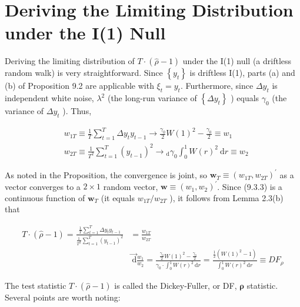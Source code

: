 \documentclass[10pt]{article}
\begin{document}
\section*{Deriving the Limiting Distribution under the I(1) Null}
Deriving the limiting distribution of $T \cdot(\hat{\rho}-1)$ under the I(1) null (a driftless random walk) is very straightforward. Since $\left\{y_{t}\right\}$ is driftless I(1), parts (a) and (b) of Proposition 9.2 are applicable with $\xi_{t}=y_{t}$. Furthermore, since $\Delta y_{t}$ is independent white noise, $\lambda^{2}$ (the long-run variance of $\left\{\Delta y_{t}\right\}$ ) equals $\gamma_{0}$ (the variance of $\Delta y_{t}$ ). Thus,


\begin{align*}
& w_{1 T} \equiv \frac{1}{T} \sum_{t=1}^{T} \Delta y_{t} y_{t-1} \rightarrow \frac{\gamma_{0}}{2} W(1)^{2}-\frac{\gamma_{0}}{2} \equiv w_{1}  \tag{9.3.4}\\
& w_{2 T} \equiv \frac{1}{T^{2}} \sum_{t=1}^{T}\left(y_{t-1}\right)^{2} \rightarrow{ }_{\mathrm{d}} \gamma_{0} \int_{0}^{1} W(r)^{2} \mathrm{~d} r \equiv w_{2} \tag{9.3.5}
\end{align*}


As noted in the Proposition, the convergence is joint, so $\mathbf{w}_{T} \equiv\left(w_{1 T}, w_{2 T}\right)^{\prime}$ as a vector converges to a $2 \times 1$ random vector, $\mathbf{w} \equiv\left(w_{1}, w_{2}\right)^{\prime}$. Since (9.3.3) is a continuous function of $\mathbf{w}_{T}$ (it equals $w_{1 T} / w_{2 T}$ ), it follows from Lemma 2.3(b) that


\begin{align*}
T \cdot(\hat{\rho}-1)=\frac{\frac{1}{T} \sum_{t=1}^{T} \Delta y_{t} y_{t-1}}{\frac{1}{T^{2}} \sum_{t=1}^{T}\left(y_{t-1}\right)^{2}} & =\frac{w_{1 T}}{w_{2 T}} \\
& \overrightarrow{\mathrm{~d}} \frac{w_{1}}{w_{2}}=\frac{\frac{\gamma_{0}}{2} W(1)^{2}-\frac{\gamma_{0}}{2}}{\gamma_{0} \cdot \int_{0}^{1} W(r)^{2} \mathrm{~d} r}=\frac{\frac{1}{2}\left(W(1)^{2}-1\right)}{\int_{0}^{1} W(r)^{2} \mathrm{~d} r} \equiv D F_{\rho} \tag{9.3.6}
\end{align*}


The test statistic $T \cdot(\hat{\rho}-1)$ is called the Dickey-Fuller, or DF, $\boldsymbol{\rho}$ statistic. Several points are worth noting:
\end{document}
